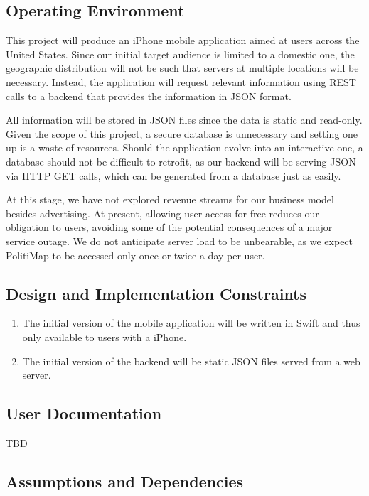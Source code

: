 \documentclass[12pt,oneside,letterpaper]{article}
\newcounter{use_case}
\begin{document}
\subsection{Operating Environment}
This project will produce an iPhone mobile application aimed at
users across the United States. Since our initial target audience is
limited to a domestic one, the geographic distribution will not be such
that servers at multiple locations will be necessary. Instead, the
application will request relevant information using REST calls to a
backend that provides the information in JSON format.

All information will be stored in JSON files since the data is static
and read-only. Given the scope of this project, a secure database is
unnecessary and setting one up is a waste of resources.  Should the
application evolve into an interactive one, a database should not be
difficult to retrofit, as our backend will be serving JSON via HTTP GET
calls, which can be generated from a database just as easily.

At this stage, we have not explored revenue streams for our business
model besides advertising. At present, allowing user access for free
reduces our obligation to users, avoiding some of the potential
consequences of a major service outage. We do not anticipate server
load to be unbearable, as we expect PolitiMap to be accessed only once
or twice a day per user.

\subsection{Design and Implementation Constraints}
\begin{enumerate}
\item The initial version of the mobile application will be written in
  Swift and thus only available to users with a iPhone.
\item The initial version of the backend will be static JSON files
  served from a web server.
\end{enumerate}

\subsection{User Documentation}
TBD

\subsection{Assumptions and Dependencies}
\end{document}
